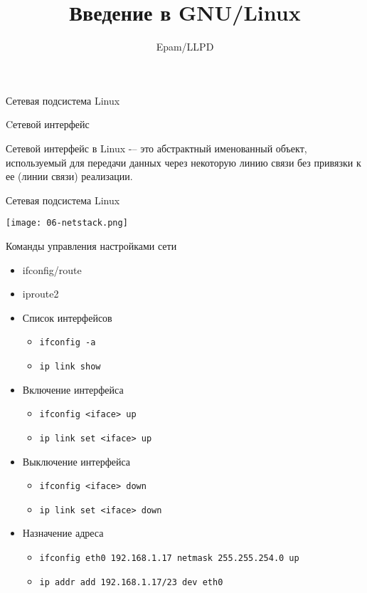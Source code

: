 \documentclass[ignorenonframetext, professionalfonts, hyperref={pdftex, unicode}]{beamer}
\title{Введение в GNU/Linux}
\author{Epam/LLPD}
\begin{document}
\frame{
	\tableofcontents
}

\begin{frame}{Сетевая подсистема Linux}

	\begin{block}{Cетевой интерфейс}

		Сетевой интерфейс в Linux -– это абстрактный именованный объект,  используемый для передачи 
		данных через некоторую линию связи без привязки к ее (линии связи) реализации.
	\end{block}
\end{frame}

\begin{frame}{Сетевая подсистема Linux}

	\center\texttt{[image: 06-netstack.png]}

\end{frame}

\begin{frame}{Команды управления настройками сети}
	\begin{itemize}
	  \item ifconfig/route
	  \item iproute2
	\end{itemize}

	\begin{itemize}
		\item Список интерфейсов
			\begin{itemize}
				\item {\tt ifconfig -a}
				\item {\tt ip link show}
			\end{itemize}
		\item Включение интерфейса 
			\begin{itemize}
				\item {\tt ifconfig <iface> up}
				\item {\tt ip link set <iface> up}
			\end{itemize}
	  \item Выключение интерфейса
			\begin{itemize}
				\item {\tt ifconfig <iface> down}
				\item {\tt ip link set <iface> down}
			\end{itemize}
	  \item Назначение адреса
			\begin{itemize}
				\item {\tt ifconfig eth0 192.168.1.17 netmask 255.255.254.0 up}
				\item {\tt ip addr add 192.168.1.17/23 dev eth0}
			\end{itemize}
	\end{itemize}
\end{frame}
\end{document}
